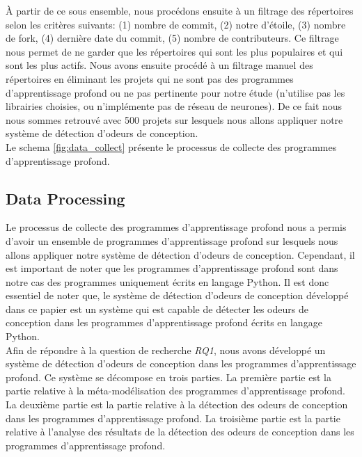 À partir de ce sous ensemble, nous procédons ensuite à un filtrage des répertoires selon les
critères suivants: (1) nombre de commit, (2) notre d'étoile, (3) nombre de fork, (4) dernière date du
commit, (5) nombre de contributeurs. Ce filtrage nous permet de ne garder que
les répertoires qui sont les plus populaires et qui sont les plus actifs. Nous
avons ensuite procédé à un filtrage manuel des répertoires en éliminant les
projets qui ne sont pas des programmes d'apprentissage profond ou ne pas
pertinente pour notre étude (n'utilise pas les librairies choisies, ou
n'implémente pas de réseau de neurones). De ce fait nous nous sommes retrouvé
avec 500 projets sur lesquels nous allons appliquer notre système de détection
d'odeurs de conception.\\ Le schema \ref{fig:data_collect} présente le processus
de collecte des programmes d'apprentissage profond.\\








\subsection{Data Processing}
\label{sec:DataProcessing}
Le processus de collecte des programmes d'apprentissage profond nous a permis
d'avoir un ensemble de programmes d'apprentissage profond sur lesquels nous
allons appliquer notre système de détection d'odeurs de conception. Cependant,
il est important de noter que les programmes d'apprentissage profond sont dans
notre cas des programmes uniquement écrits en langage Python. Il est donc
essentiel de noter que, le système de détection d'odeurs de conception développé
dans ce papier est un système qui est capable de détecter les odeurs de
conception dans les programmes d'apprentissage profond écrits en langage
Python.\\

Afin de répondre à la question de recherche \emph{RQ1}, nous avons développé un système de détection d'odeurs de
conception dans les programmes d'apprentissage profond. Ce système se décompose
en trois parties. La première partie est la partie relative à la
méta-modélisation des programmes d'apprentissage profond. La
deuxième partie est la partie relative à la détection des odeurs de conception
dans les programmes d'apprentissage profond. La troisième partie est la partie
relative à l'analyse des résultats de la détection des odeurs de conception dans
les programmes d'apprentissage profond.


